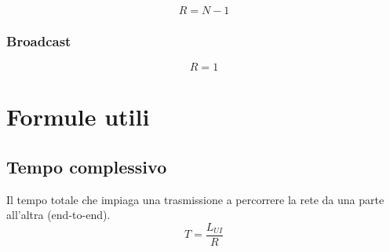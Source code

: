 \documentclass{report}
\begin{document}
\begin{equation}
  \label{eq:topbus}
  R=N-1
\end{equation}

\subsection{Broadcast}
\label{sec:broadcast}
\begin{equation}
  \label{eq:broadcast}
  R=1
\end{equation}

\chapter{Formule utili}
\label{chap:formuleutili}

\section{Tempo complessivo}
\label{sec:temp-compl}
Il tempo totale che impiaga una trasmissione a percorrere la rete da una parte
all'altra (end-to-end). 
\begin{equation}
  \label{eq:temp-comp}
  T=\frac{L_{UI}}{R}
\end{equation}
\end{document}
